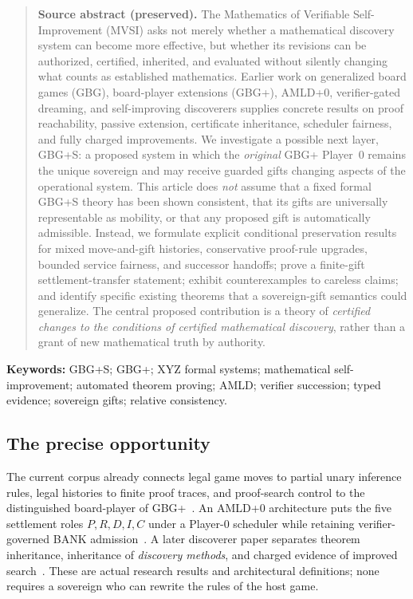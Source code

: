 \documentclass[11pt,letterpaper]{article}
\theoremstyle{definition}\newtheorem{definition}[theorem]{Definition}\newtheorem{example}[theorem]{Example}
\theoremstyle{remark}\newtheorem{remark}[theorem]{Remark}
\begin{document}
\begin{quote}\small\textbf{Source abstract (preserved).} The Mathematics of Verifiable Self-Improvement (MVSI) asks not merely whether a mathematical discovery system can become more effective, but whether its revisions can be authorized, certified, inherited, and evaluated without silently changing what counts as established mathematics. Earlier work on generalized board games (GBG), board-player extensions (GBG+), AMLD+0, verifier-gated dreaming, and self-improving discoverers supplies concrete results on proof reachability, passive extension, certificate inheritance, scheduler fairness, and fully charged improvements. We investigate a possible next layer, GBG+S: a proposed system in which the \emph{original} GBG+ Player~0 remains the unique sovereign and may receive guarded gifts changing aspects of the operational system. This article does \emph{not} assume that a fixed formal GBG+S theory has been shown consistent, that its gifts are universally representable as mobility, or that any proposed gift is automatically admissible. Instead, we formulate explicit conditional preservation results for mixed move-and-gift histories, conservative proof-rule upgrades, bounded service fairness, and successor handoffs; prove a finite-gift settlement-transfer statement; exhibit counterexamples to careless claims; and identify specific existing theorems that a sovereign-gift semantics could generalize. The central proposed contribution is a theory of \emph{certified changes to the conditions of certified mathematical discovery}, rather than a grant of new mathematical truth by authority.\end{quote}





\textbf{Keywords:} GBG+S; GBG+; XYZ formal systems; mathematical self-improvement; automated theorem proving; AMLD; verifier succession; typed evidence; sovereign gifts; relative consistency.


\subsection{The precise opportunity}
The current corpus already connects legal game moves to partial unary inference rules, legal histories to finite proof traces, and proof-search control to the distinguished board-player of GBG+~\cite{mvsi:GBG,mvsi:GBGp}. An AMLD+0 architecture puts the five settlement roles $P,R,D,I,C$ under a Player-0 scheduler while retaining verifier-governed BANK admission~\cite{mvsi:AMLD0}. A later discoverer paper separates theorem inheritance, inheritance of \emph{discovery methods}, and charged evidence of improved search~\cite{mvsi:Successor}. These are actual research results and architectural definitions; none requires a sovereign who can rewrite the rules of the host game.
\end{document}
